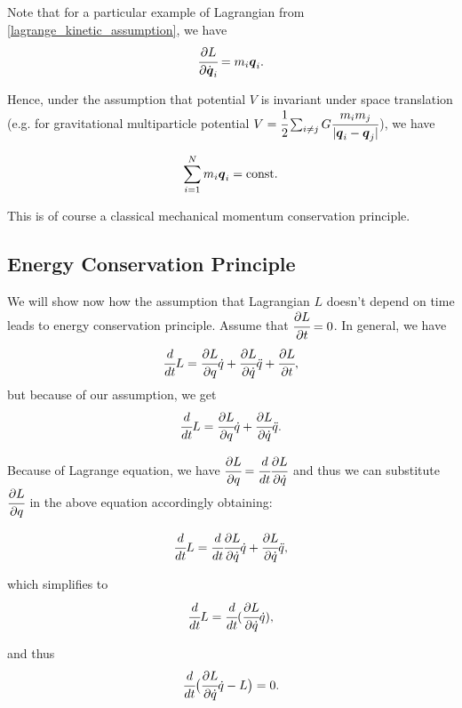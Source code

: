 \documentclass[main.tex]{subfiles}
\begin{document}
Note that for a particular example of Lagrangian from \ref{lagrange_kinetic_assumption},
we have 
\begin{equation}
\cfrac{\partial L}{\partial \dot{\boldsymbol{q}}_i} = m_i \boldsymbol{q}_i.
\end{equation}

Hence, under the assumption that potential $V$ is invariant under space translation (e.g. for gravitational multiparticle potential $V = \cfrac{1}{2}\sum_{i \not=j} G \cfrac{m_i m_j}{|\boldsymbol{q}_i - \boldsymbol{q}_j|}$), we have

\begin{equation}
\sum_{i=1}^{N}  m_i \boldsymbol{q}_i = \text{const}.
\end{equation} 

This is of course a classical mechanical momentum conservation principle.
\subsection{Energy Conservation Principle}
We will show now how the assumption that Lagrangian $L$ doesn't depend on time leads to energy conservation principle.
Assume that $\cfrac{\partial L}{\partial t} = 0$.
In general, we have
\begin{equation}
\cfrac{d}{dt} L = \cfrac{\partial L}{\partial q}\dot{q} + \cfrac{\partial L}{\partial \dot{q}}\ddot{q} + \cfrac{\partial L}{\partial t},
\end{equation}
but because of our assumption, we get
\begin{equation}
\cfrac{d}{dt} L = \cfrac{\partial L}{\partial q}\dot{q} + \cfrac{\partial L}{\partial \dot{q}}\ddot{q}.
\end{equation}

Because of Lagrange equation, we have $\cfrac{\partial L}{\partial q} = \cfrac{d}{dt}\cfrac{\partial L}{\partial \dot{q}}$ and thus we can substitute $\cfrac{\partial L}{\partial q}$ in the above equation accordingly obtaining:

\begin{equation}
\cfrac{d}{dt} L = \cfrac{d}{dt}\cfrac{\partial L}{\partial \dot{q}}\dot{q} + \cfrac{\partial L}{\partial \dot{q}}\ddot{q},
\end{equation}

which simplifies to
\begin{equation}
\cfrac{d}{dt} L = \cfrac{d}{dt}(\cfrac{\partial L}{\partial \dot{q}}\dot{q}),
\end{equation}

and thus
\begin{equation}
\cfrac{d}{dt} \big( \cfrac{\partial L}{\partial \dot{q}}\dot{q} - L \big) = 0.
\end{equation}
 
\end{document}
